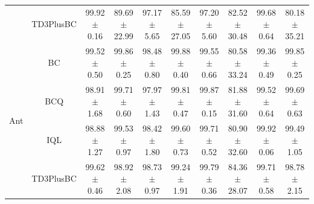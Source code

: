 \begin{table}[!ht]
\begin{tabular}{cccccccccc}
                                                                                           & TD3PlusBC                                                                                  & 99.92$\pm$0.16 & 89.69$\pm$22.99 & 97.17$\pm$5.65 & 85.59$\pm$27.05 & 97.20$\pm$5.60 & 82.52$\pm$30.48                              & 99.68$\pm$0.64  & 80.18$\pm$35.21                                   \\ 
    \cline{2-10}
    \multirow{4}{*}{Ant}                                                                   & BC                                                                                         & 99.52$\pm$0.50 & 99.86$\pm$0.25  & 98.48$\pm$0.80 & 99.88$\pm$0.40  & 99.55$\pm$0.66 & 80.58$\pm$33.24                              & 99.36$\pm$0.49  & 99.85$\pm$0.25                                    \\
                                                                                           & BCQ                                                                                        & 98.91$\pm$1.68 & 99.71$\pm$0.60  & 97.97$\pm$1.43 & 99.81$\pm$0.47  & 99.87$\pm$0.15 & 81.88$\pm$31.60                              & 99.52$\pm$0.64  & 99.69$\pm$0.63                                    \\
                                                                                           & IQL                                                                                        & 98.88$\pm$1.27 & 99.53$\pm$0.97  & 98.42$\pm$1.80 & 99.60$\pm$0.73  & 99.71$\pm$0.52 & 80.90$\pm$32.60                              & 99.92$\pm$0.06  & 99.49$\pm$1.05                                    \\
                                                                                           & TD3PlusBC                                                                                  & 99.62$\pm$0.46 & 98.92$\pm$2.08  & 98.73$\pm$0.97 & 99.24$\pm$1.91  & 99.79$\pm$0.36 & 84.36$\pm$28.07                              & 99.71$\pm$0.58  & 98.78$\pm$2.15                                    \\
    \bottomrule
    \end{tabular}
\end{table}
    
